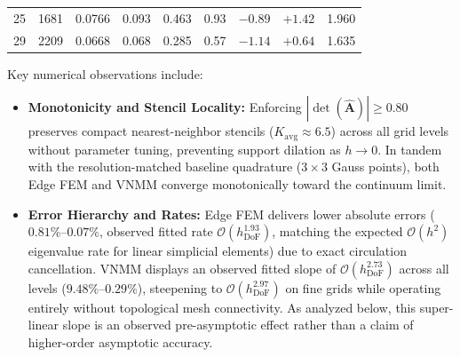 \documentclass[preprint,12pt]{elsarticle}
\begin{document}
\begin{table}[!htbp]
{\begin{tabular}{@{} c c c c cccc c @{}}
            25            & 1681               & 0.0766                 & 0.093               & 0.463                                                            & 0.93                                      & $-0.89$                 & $+1.42$                    & 1.960                     \\
            29            & 2209               & 0.0668                 & 0.068               & 0.285                                                            & 0.57                                      & $-1.14$                 & $+0.64$                    & 1.635                     \\
            \bottomrule
        \end{tabular}%
    }
\end{table}

Key numerical observations include:
\begin{itemize}
    \item \textbf{Monotonicity and Stencil Locality:} Enforcing $|\det(\widehat{\mathbf{A}})| \ge 0.80$ preserves compact nearest-neighbor stencils ($K_{\mathrm{avg}} \approx 6.5$) across all grid levels without parameter tuning, preventing support dilation as $h \to 0$. In tandem with the resolution-matched baseline quadrature ($3 \times 3$ Gauss points), both Edge FEM and VNMM converge monotonically toward the continuum limit.
    \item \textbf{Error Hierarchy and Rates:} Edge FEM delivers lower absolute errors ($0.81\%\text{--}0.07\%$, observed fitted rate $\mathcal{O}(h_{\mathrm{DoF}}^{1.93})$, matching the expected $\mathcal{O}(h^2)$ eigenvalue rate for linear simplicial elements) due to exact circulation cancellation. VNMM displays an observed fitted slope of $\mathcal{O}(h_{\mathrm{DoF}}^{2.73})$ across all levels ($9.48\%\text{--}0.29\%$), steepening to $\mathcal{O}(h_{\mathrm{DoF}}^{2.97})$ on fine grids while operating entirely without topological mesh connectivity. As analyzed below, this super-linear slope is an observed pre-asymptotic effect rather than a claim of higher-order asymptotic accuracy.
\end{itemize}
\end{document}
